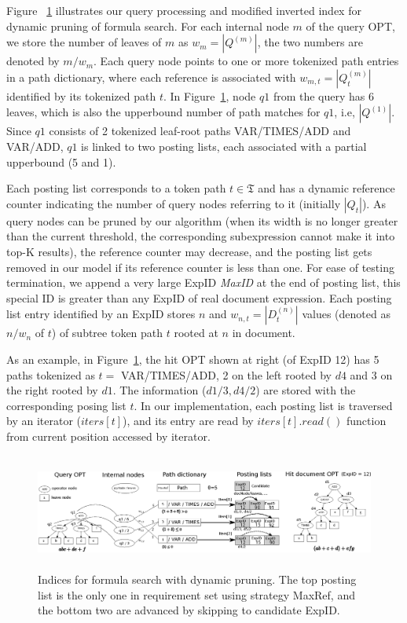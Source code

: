 \documentclass[runningheads]{llncs}
\begin{document}
Figure ~\ref{figillu} illustrates our query processing and modified inverted index for dynamic pruning of formula search.
For each internal node $m$ of the query OPT, we store the number of leaves of $m$  as $w_m = |Q^{(m)}|$, the two numbers are denoted by $m/w_m$.
Each query node points to one or more tokenized path entries in a  path dictionary,
where each reference is associated with $w_{m,t} = |Q^{(m)}_t|$ identified by its tokenized path $t$.
%
In Figure~\ref{figillu}, node $q1$ from the query has 6 leaves, which is also the upperbound number of path matches for $q1$, i.e, $|Q^{(1)}|$.
Since $q1$ consists of 2 tokenized leaf-root paths VAR/TIMES/ADD and VAR/ADD,
$q1$ is linked to two posting lists, each associated with a partial upperbound (5 and 1).

Each posting list corresponds to a token path $t \in \mathfrak{T}$ and has a dynamic reference counter indicating the number of query nodes referring to it (initially $|Q_t|$).
As query nodes can be pruned by our algorithm (when its width is no longer greater than the current threshold, the corresponding subexpression cannot make it into top-K results),
the reference counter may decrease, and the posting list gets removed in our model if its reference counter is less than one.
%
For ease of testing termination, we append a very large ExpID \emph{MaxID} at the end of posting list, this special ID is greater than any ExpID of real document expression.
%
Each posting list entry identified by an ExpID stores $n$ and $w_{n,t} = |D^{(n)}_t|$ values (denoted as $n/w_n$ of $t$) of subtree token path $t$ rooted at $n$ in document.

As an example, in Figure~\ref{figillu}, the hit OPT shown at right (of ExpID 12) has 5 paths tokenized as $t =$ VAR/TIMES/ADD, 2 on the left rooted by $d4$ and 3 on the right rooted by $d1$. The information ($d1/3, d4/2$) are stored with the corresponding posing list $t$.
In our implementation, each posting list is traversed by an iterator ($iters[t]$), and its entry are read by $iters[t].read()$ function from current position accessed by iterator.

\begin{figure}[!t]
\begin{center}
\hspace*{-0.6in}\includegraphics[height=1.5in]{fig/drawing.eps}
\caption{Indices for formula search with dynamic pruning. The top posting list is the only one in requirement set using strategy MaxRef, and the bottom two are advanced by skipping to candidate ExpID.}
\label{figillu}
\end{center}
\end{figure}
\end{document}
